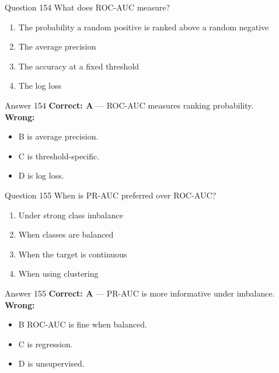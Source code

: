 \documentclass[aspectratio=169,11pt]{beamer}
\begin{document}
	\begin{frame}{Question 154}
		What does ROC-AUC measure?
		\begin{enumerate}[label=\Alph*.]
			\item The probability a random positive is ranked above a random negative
			\item The average precision
			\item The accuracy at a fixed threshold
			\item The log loss
		\end{enumerate}
	\end{frame}
	\begin{frame}{Answer 154}
		\textbf{Correct: A} --- ROC-AUC measures ranking probability.\\
		\vspace{0.5em}
		\textbf{Wrong:}
		\begin{itemize}
			\item B is average precision.
			\item C is threshold-specific.
			\item D is log loss.
		\end{itemize}
	\end{frame}
	
	\begin{frame}{Question 155}
		When is PR-AUC preferred over ROC-AUC?
		\begin{enumerate}[label=\Alph*.]
			\item Under strong class imbalance
			\item When classes are balanced
			\item When the target is continuous
			\item When using clustering
		\end{enumerate}
	\end{frame}
	\begin{frame}{Answer 155}
		\textbf{Correct: A} --- PR-AUC is more informative under imbalance.\\
		\vspace{0.5em}
		\textbf{Wrong:}
		\begin{itemize}
			\item B ROC-AUC is fine when balanced.
			\item C is regression.
			\item D is unsupervised.
		\end{itemize}
	\end{frame}
	
\end{document}
